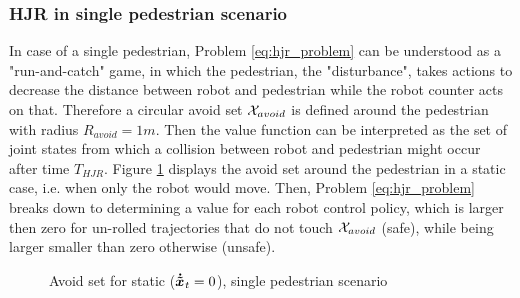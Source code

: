 \subsubsection{\ac{HJR} in single pedestrian scenario}
In case of a single pedestrian, Problem \ref{eq:hjr_problem} can be understood as a "run-and-catch" game, in which the pedestrian, the "disturbance", takes actions to decrease the distance between robot and pedestrian while the robot counter acts on that. Therefore a circular avoid set $\mathcal{X}_{avoid}$ is defined around the pedestrian with radius $R_{avoid} = 1m$. Then the value function can be interpreted as the set of joint states from which a collision between robot and pedestrian might occur after time $T_{HJR}$.
\newline
Figure \ref{img:hj_game} displays the avoid set around the pedestrian in a static case, i.e. when only the robot would move. Then, Problem \ref{eq:hjr_problem} breaks down to determining a value for each robot control policy, which is larger then zero for un-rolled trajectories that do not touch $\mathcal{X}_{avoid}$ (safe), while being larger smaller than zero otherwise (unsafe).

\begin{figure}[!ht]
\begin{center}
\end{center}
\caption{Avoid set for static ($\dxped[]_t = 0$), single pedestrian scenario}
\label{img:hj_game}
\end{figure}

